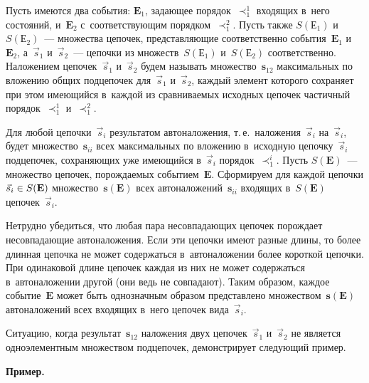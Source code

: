 \begin{multicols}{2}
  Пусть имеются два события: $\mathbf{E}_1$, задающее порядок~$\prec_1^1$ 
входящих в~него состояний, и~$\mathbf{E}_2$ с~со\-от\-вет\-ст\-ву\-ющим 
порядком~$\prec_1^2$. Пусть также $S(\mathbf{Е}_1)$ и~$S(\mathbf{Е}_2)$~--- 
множества цепочек, пред\-став\-ля\-ющие соответственно события~$\mathbf{E}_1$ 
и~$\mathbf{E}_2$, а~$\vec{s}_1$ и~$\vec{s}_2$~--- цепочки из 
множеств~$S(\mathbf{Е}_1)$ и~$S(\mathbf{Е}_2)$ соответственно. Наложением 
цепочек~$\vec{s}_1$ и~$\vec{s}_2$ будем называть 
множество~$\mathbf{s}_{12}$ максимальных по вложению общих подцепочек 
для~$\vec{s}_1$ и~$\vec{s}_2$, каж\-дый элемент которого сохраняет при этом 
име\-ющий\-ся в~каж\-дой из сравниваемых исходных цепочек час\-тич\-ный 
порядок~$\prec_1^1$ и~$\prec_1^2$.
  
  Для любой цепочки~$\vec{s}_i$ результатом автоналожения, т.\,е.\ 
наложения~$\vec{s}_i$ на~$\vec{s}_i$, будет множество~$\mathbf{s}_{ii}$ всех 
максимальных по вложению в~исходную цепочку~$\vec{s}_i$ подцепочек, 
со\-хра\-ня\-ющих уже име\-ющий\-ся в~$\vec{s}_i$ порядок~$\prec_1^i$. Пусть 
$S(\mathbf{E})$~--- множество цепочек, по\-рож\-да\-емых событием~$\mathbf{E}$. 
Сформируем для каждой цепочки $\vec{s}_i\hm\in  S(\mathbf{E})$ 
множество~$\mathbf{s}(\mathbf{E})$ всех автоналожений~$\mathbf{s}_{ii}$ 
входящих в~$S(\mathbf{E})$ цепочек~$\vec{s}_i$.
  
  Нетрудно убедиться, что любая пара несовпадающих цепочек порождает 
несовпадающие автоналожения. Если эти цепочки имеют разные длины, то 
более длинная цепочка не может содержаться в~автоналожении более короткой 
цепочки. При одинаковой длине цепочек каждая из них не может содержаться 
в~автоналожении другой (они ведь не совпадают). Таким образом, каждое 
событие~$\mathbf{E}$ может быть однозначным образом пред\-став\-ле\-но 
множеством~$\mathbf{s}(\mathbf{E})$ автоналожений всех входящих в~него 
цепочек вида~$\vec{s}_i$.
  
  Ситуацию, когда результат~$\mathbf{s}_{12}$ наложения двух 
цепочек~$\vec{s}_1$ и~$\vec{s}_2$ не является одноэлементным множеством 
подцепочек, демонстрирует сле\-ду\-ющий пример.
  
  \smallskip
  
  \noindent
  \textbf{Пример.} 
  

\end{multicols}
